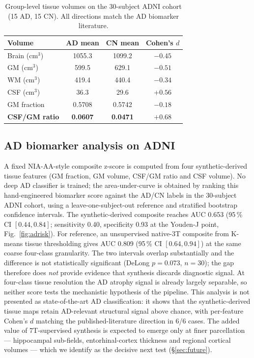 \documentclass[10pt,twocolumn,a4paper]{article}
\begin{document}
\begin{table}[!t]
\caption{Group-level tissue volumes on the 30-subject ADNI cohort
(15 AD, 15 CN). All directions match the AD biomarker literature.}
\label{tab:adni-volumes}
\centering
\small
\begin{tabular}{lccc}
\toprule
Volume & AD mean & CN mean & Cohen's $d$ \\
\midrule
Brain (cm$^3$)           & 1055.3 & 1099.2 & $-0.45$ \\
GM (cm$^3$)              &  599.5 &  629.1 & $-0.51$ \\
WM (cm$^3$)              &  419.4 &  440.4 & $-0.34$ \\
CSF (cm$^3$)             &   36.3 &   29.6 & $+0.56$ \\
GM fraction              & 0.5708 & 0.5742 & $-0.18$ \\
\textbf{CSF/GM ratio}    & \textbf{0.0607} & \textbf{0.0471} & $\mathbf{+0.68}$ \\
\bottomrule
\end{tabular}
\end{table}

\subsection{AD biomarker analysis on ADNI}
\label{sec:res-biomarker}

A fixed NIA-AA-style composite z-score \cite{jack2018niaaa} is computed
from four synthetic-derived tissue features (GM fraction, GM volume,
CSF/GM ratio and CSF volume). No deep AD classifier is trained; the
area-under-curve is obtained by ranking this hand-engineered biomarker
score against the AD/CN labels in the 30-subject ADNI cohort, using a
leave-one-subject-out reference and stratified bootstrap confidence
intervals. The synthetic-derived composite reaches AUC 0.653
(95\,\% CI $[0.44, 0.84]$; sensitivity 0.40, specificity 0.93 at the
Youden-J point, Fig.~\ref{fig:adrisk}). For reference, an unsupervised
native-3T composite from K-means tissue thresholding gives AUC 0.809
(95\,\% CI $[0.64, 0.94]$) at the same coarse four-class granularity.
The two intervals overlap substantially and the difference is not
statistically significant (DeLong $p=0.073$, $n=30$); the gap therefore
does \emph{not} provide evidence that synthesis discards diagnostic
signal. At four-class tissue resolution the AD atrophy signal is already
largely separable, so neither score tests the mechanistic hypothesis of
the pipeline. This analysis is not presented as state-of-the-art AD
classification: it shows that the synthetic-derived tissue maps retain
AD-relevant structural signal above chance, with per-feature Cohen's $d$
matching the published-literature direction in 6/6 cases. The added
value of 7T-supervised synthesis is expected to emerge only at finer
parcellation --- hippocampal sub-fields, entorhinal-cortex thickness and
regional cortical volumes --- which we identify as the decisive next
test (\S\ref{sec:future}).
\end{document}
